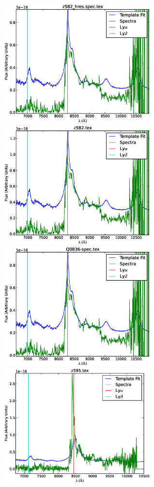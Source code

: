 \documentclass[11pt]{article}
\begin{document}
\begin{figure}[h]
  \centering
  \includegraphics[width=8cm]{z582_hres.spec.eps}
  \includegraphics[width=8cm]{z582.eps}
  \includegraphics[width=8cm]{Q0836-spec.eps}
  \includegraphics[width=8cm]{z595.eps}

\end{figure}
\end{document}
